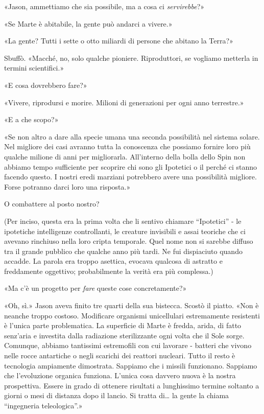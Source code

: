 «Jason, ammettiamo che sia possibile, ma a cosa ci \emph{servirebbe}?»

«Se Marte è abitabile, la gente può andarci a vivere.»

«La gente? Tutti i sette o otto miliardi di persone che abitano la
Terra?»

Sbuffò. «Macché, no, solo qualche pioniere. Riproduttori, se vogliamo
metterla in termini scientifici.»

«E cosa dovrebbero fare?»

«Vivere, riprodursi e morire. Milioni di generazioni per ogni anno
terrestre.»

«E a che scopo?»

«Se non altro a dare alla specie umana una seconda possibilità nel
sistema solare. Nel migliore dei casi avranno tutta la conoscenza che
possiamo fornire loro più qualche milione di anni per migliorarla.
All'interno della bolla dello Spin non abbiamo tempo sufficiente per
scoprire chi sono gli Ipotetici o il perché ci stanno facendo questo. I
nostri eredi marziani potrebbero avere una possibilità migliore. Forse
potranno darci loro una risposta.»

O combattere al posto nostro?

(Per inciso, questa era la prima volta che li sentivo chiamare
``Ipotetici'' - le ipotetiche intelligenze controllanti, le creature
invisibili e assai teoriche che ci avevano rinchiuso nella loro cripta
temporale. Quel nome non si sarebbe diffuso tra il grande pubblico che
qualche anno più tardi. Ne fui dispiaciuto quando accadde. La parola era
troppo asettica, evocava qualcosa di astratto e freddamente oggettivo;
probabilmente la verità era più complessa.)

«Ma c'è un progetto per \emph{fare} queste cose concretamente?»

«Oh, sì.» Jason aveva finito tre quarti della sua bistecca. Scostò il
piatto. «Non è neanche troppo costoso. Modificare organismi unicellulari
estremamente resistenti è l'unica parte problematica. La superficie di
Marte è fredda, arida, di fatto senz'aria e investita dalla radiazione
sterilizzante ogni volta che il Sole sorge. Comunque, abbiamo tantissimi
estremofili con cui lavorare - batteri che vivono nelle rocce antartiche
o negli scarichi dei reattori nucleari. Tutto il resto è tecnologia
ampiamente dimostrata. Sappiamo che i missili funzionano. Sappiamo che
l'evoluzione organica funziona. L'unica cosa davvero nuova è la nostra
prospettiva. Essere in grado di ottenere risultati a lunghissimo termine
soltanto a giorni o mesi di distanza dopo il lancio. Si tratta
di\ldots{} la gente la chiama ``ingegneria teleologica''.»

